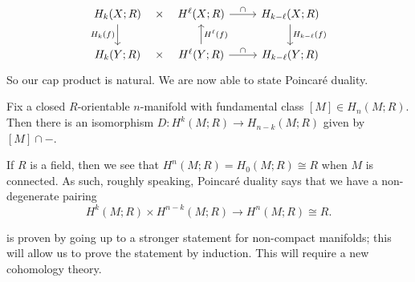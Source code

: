 \documentclass[../notes.tex]{subfiles}
\begin{document}
\[\begin{tikzcd}
	{H_k(X;R)} & {H^\ell(X;R)} & {H_{k-\ell}(X;R)} \\
	{H_k(Y;R)} & {H^\ell(Y;R)} & {H_{k-\ell}(Y;R)}
	\arrow["\times"{marking, allow upside down}, draw=none, from=1-1, to=1-2]
	\arrow["\times"{marking, allow upside down}, draw=none, from=2-1, to=2-2]
	\arrow["{H_k(f)}"', from=1-1, to=2-1]
	\arrow["{H^\ell(f)}"', from=2-2, to=1-2]
	\arrow["{H_{k-\ell}(f)}", from=1-3, to=2-3]
	\arrow["\cap", from=1-2, to=1-3]
	\arrow["\cap", from=2-2, to=2-3]
\end{tikzcd}\]
So our cap product is natural. We are now able to state Poincar\'e duality.
\begin{theorem} \label{thm:pd}
	Fix a closed $R$-orientable $n$-manifold with fundamental class $[M]\in H_n(M;R)$. Then there is an isomorphism $D\colon H^k(M;R)\to H_{n-k}(M;R)$ given by $[M]\cap-$.
\end{theorem}
\begin{remark}
	If $R$ is a field, then we see that $H^n(M;R)=H_0(M;R)\cong R$ when $M$ is connected. As such, roughly speaking, Poincar\'e duality says that we have a non-degenerate pairing
	\[H^k(M;R)\times H^{n-k}(M;R)\to H^n(M;R)\cong R.\]
\end{remark}
 is proven by going up to a stronger statement for non-compact manifolds; this will allow us to prove the statement by induction. This will require a new cohomology theory.
\end{document}
